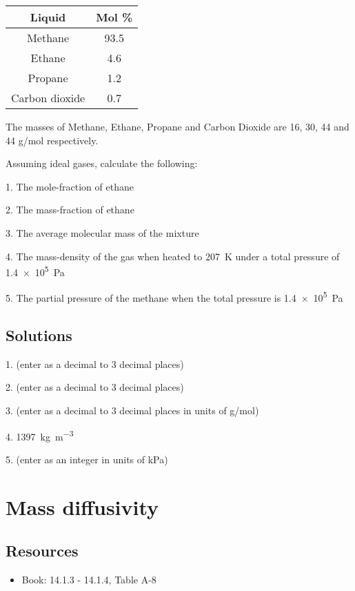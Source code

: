 \begin{tabular}[c]{|c|c|}
    \hline
    \textbf{Liquid} & \textbf{Mol \%}\\
    \hline
    Methane         & 93.5  \\
    Ethane          & 4.6   \\
    Propane         & 1.2   \\
    Carbon dioxide  & 0.7   \\
    \hline
\end{tabular}

The masses of Methane, Ethane, Propane and Carbon Dioxide are 16, 30, 44 and 44 g/mol respectively.

Assuming ideal gases, calculate the following:

1. The mole-fraction of ethane

2. The mass-fraction of ethane

3. The average molecular mass of the mixture

4. The mass-density of the gas when heated to \SI{207}{\kelvin} under a total pressure of \SI{1.4e5}{\pascal}

5. The partial pressure of the methane when the total pressure is \SI{1.4e5}{\pascal}

\subsection*{Solutions}

1. (enter as a decimal to 3 decimal places) 

2. (enter as a decimal to 3 decimal places) 

3. (enter as a decimal to 3 decimal places in units of g/mol) 

4. \SI{1397}{\kg\per\cubic\meter}

5. (enter as an integer in units of kPa) 




\newpage
\section{Mass diffusivity}

\subsection*{Resources}
\begin{itemize}
    \item Book: 14.1.3 - 14.1.4, Table A-8
\end{itemize}

